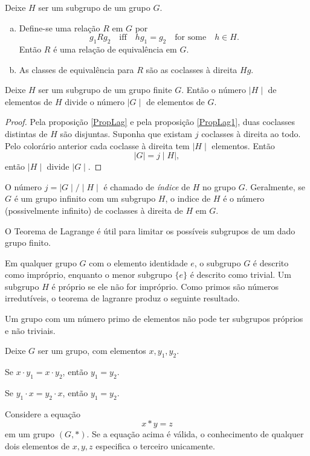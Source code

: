 \begin{stat}\label{PropLag}
  Deixe $H$ ser um subgrupo de um grupo $G$.
  \begin{enumerate}[a.]
    \item Define-se uma relação $R$ em $G$ por $$ g_{1} R g_{2}\quad \textrm{iff}\quad hg_{1} = g_{2}\quad \textrm{for\ some}\quad h\in H.$$ Então $R$ é uma relação de equivalência em $G$.
    \item As classes de equivalência para $R$ são as coclasses à direita $Hg$.
  \end{enumerate}
\end{stat}

\begin{theorem}
  Deixe $H$ ser um subgrupo de um grupo finite $G$. Então o número $\mid H\mid$ de elementos de $H$ divide o número $\mid G\mid$ de elementos de $G$.
  \begin{proof}
    Pela proposição \ref{PropLag} e pela proposição \ref{PropLag1}, duas coclasses distintas de $H$ são disjuntas. Suponha que existam $j$ coclasses à direita ao todo. Pelo colorário anterior cada coclasse à direita tem $\mid H \mid$ elementos. Então
    $$ \mid G\mid = j\mid H\mid,$$ então $\mid H \mid $ divide $\mid G \mid $.
  \end{proof}
\end{theorem}

O número $j = \mid G\mid / \mid H\mid$ é chamado de \emph{índice} de $H$ no grupo $G$. Geralmente, se $G$ é um grupo infinito com um subgrupo $H$, o indice de $H$ é o número (possivelmente infinito) de coclasses à direita de $H$ em $G$.

O Teorema de Lagrange é útil para limitar os possíveis subgrupos de um dado grupo finito.

Em qualquer grupo $G$ com o elemento identidade $e$, o subgrupo $G$ é descrito como impróprio, enquanto o menor subgrupo $\{e\}$ é descrito como trivial. Um subgrupo $H$ é próprio se ele não for impróprio. Como primos são números irredutíveis, o teorema de lagranre produz o seguinte resultado.
\begin{stat}
  Um grupo com um número primo de elementos não pode ter subgrupos próprios e não triviais.
\end{stat}

\begin{stat}
  Deixe $G$ ser um grupo, com elementos $x,y_{1},y_{2}$.
  

  Se $x\cdot y_{1} = x\cdot y_{2}$, então $y_{1} = y_{2}$.

  Se $y_{1}\cdot x = y_{2}\cdot x$, então $y_{1} = y_{2}$.
\end{stat}
\begin{corollary}\label{UnicSolu}
  Considere a equação $$x * y = z$$
  em um grupo $(G,*)$. Se a equação acima é válida, o conhecimento de qualquer dois elementos de $x,y,z$ especifica o terceiro unicamente.
\end{corollary}

